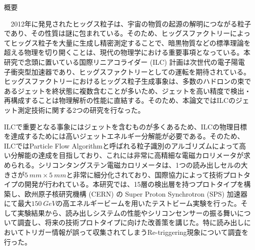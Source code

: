 
\ifabstract
 \maketitle
\fi
\begin{center}
{\LARGE 概要}\\
\end{center}
　2012年に発見されたヒッグス粒子は、宇宙の物質の起源の解明につながる粒子であり、その性質は謎に包まれている。そのため、ヒッグスファクトリーによってヒッグス粒子を大量に生成し精密測定することで、暗黒物質などの標準理論を超える物理を切り開くことは、現代の物理学における重要事項となっている。本研究で念頭に置いている国際リニアコライダー (ILC) 計画は次世代の電子陽電子衝突型加速器であり、ヒッグスファクトリーとしての運転を期待されている。ヒッグスファクトリーにおけるヒッグス粒子生成事象は、多数のハドロンの束であるジェットを終状態に複数含むことが多いため、ジェットを高い精度で検出・再構成することは物理解析の性能に直結する。そのため、本論文ではILCのジェット測定技術に関する2つの研究を行なった。

ILCで重要となる事象にはジェットを含むものが多くあるため、ILCの物理目標を達成するためには高いジェットエネルギー分解能が必要である。そのため、ILCではParticle Flow Algorithmと呼ばれる粒子識別のアルゴリズムによって高い分解能の達成を目指しており、これには非常に高精細な電磁カロリメータが求められる。シリコンタングステン電磁カロリメータは、1つの読み出しセルの大きさが$\SI{5}{mm} \times \SI{5}{mm}$と非常に細分化されており、国際協力によって技術プロトタイプの開発が行われている。本研究では、15層の検出層を持つプロトタイプを構築し、欧州原子核研究機構 (CERN) の Super Proton Synchrotron (SPS) 加速器にて最大$\SI{150}{GeV}$の高エネルギービームを用いたテストビーム実験を行った。そして実験結果から、読み出しシステムの性能やシリコンセンサーの振る舞いについて調査し、将来の技術プロトタイプに向けた改善策を講じた。特に読み出しにおいてトリガー情報が誤って収集されてしまうRe-triggering現象について調査を行った。

